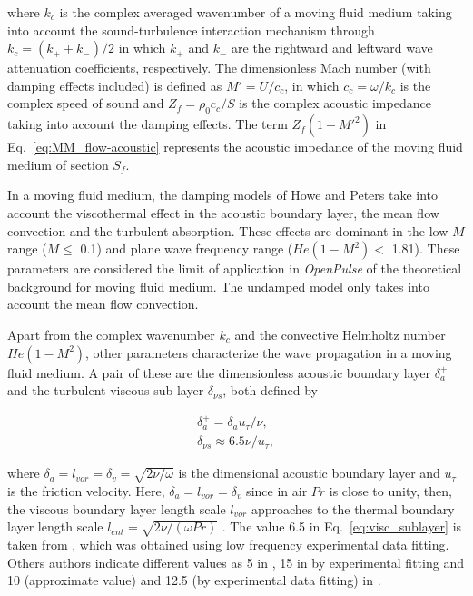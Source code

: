 \documentclass[12pt]{article}
\begin{document}
\noindent where $k_c$ is the complex averaged wavenumber of a moving fluid medium taking into account the sound-turbulence interaction mechanism through $k_c = (k_+ + k_-) / 2$ in which $k_+$ and $k_-$ are the rightward and leftward wave attenuation coefficients, respectively. The dimensionless Mach number (with damping effects included) is defined as $M'=U/c_c$, in which $c_c = \omega / k_c$ is the complex speed of sound and $Z_f = \rho_0 c_c / S $ is the complex acoustic impedance taking into account the damping effects. The term $Z_f (1 - M'^2)$ in Eq.~\ref{eq:MM_flow-acoustic} represents the acoustic impedance of the moving fluid medium of section $S_f$.

In a moving fluid medium, the damping models of Howe \cite{howe_1995} and Peters \cite{ peters_thesis, peters_hirschberg_reijnen_wijnands_1993} take into account the viscothermal effect in the acoustic boundary layer, the mean flow convection and the turbulent absorption. These effects are dominant in the low $M$ range ($M \leq$ 0.1) and plane wave frequency range ($He(1-M^2) <$ 1.81). These parameters are considered the limit of application in \textit{OpenPulse} of the theoretical background for moving fluid medium. The undamped model only takes into account the mean flow convection.

Apart from the complex wavenumber $k_c$ and the convective Helmholtz number $He(1-M^2)$, other parameters characterize the wave propagation in a moving fluid medium. A pair of these are the dimensionless acoustic boundary layer $\delta_a^+$ and the turbulent viscous sub-layer $\delta_{\nu s}$, both defined by

\begin{gather} \label{eq:ac_bl_dimnesionless}
\delta_a^+ = \delta_a u_{\tau}/ \nu, \\ \label{eq:visc_sublayer}
\delta_{\nu s} \approx 6.5 \nu / u_{\tau},
\end{gather}

\noindent where $\delta_a = l_{vor} = \delta_v = \sqrt{2 \nu / \omega}$ is the dimensional acoustic boundary layer and $u_{\tau}$ is the friction velocity. Here, $\delta_a = l_{vor} = \delta_v$ since in air $Pr$ is close to unity, then, the viscous boundary layer length scale $l_{vor} $ approaches to the thermal boundary layer length scale $l_{ent}= \sqrt{2 \nu / (\omega Pr)}$ \cite{weng_thesis}. The value 6.5 in Eq.~\ref{eq:visc_sublayer} is taken from \cite{howe_1995}, which was obtained using low frequency experimental data fitting. Others authors indicate different values as 5 in \cite{ weng_thesis,tiikoja_2016}, 15 in \cite{ronneberger_ahrens_1977} by experimental fitting and 10 (approximate value) and 12.5 (by experimental data fitting) in \cite{peters_hirschberg_reijnen_wijnands_1993, peters_thesis}. 
\end{document}
